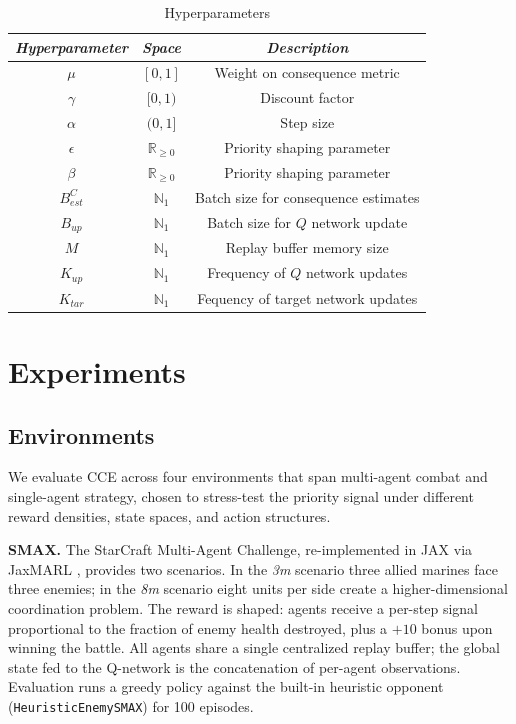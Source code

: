 \documentclass[conference]{IEEEtran}
\begin{document}
\begin{table}[htbp]
\caption{Hyperparameters}
\begin{center}
\begin{tabular}{|c|c|c|}
\hline
 \textbf{\textit{Hyperparameter}}& \textbf{\textit{Space}}& \textbf{\textit{Description}} \\
\hline
$\mu$ & $[0,1]$ & Weight on consequence metric \\
$\gamma$ & $[0,1)$ & Discount factor \\
$\alpha$ & $(0,1]$ & Step size \\
$\epsilon$ & $\mathbb{R}_{\geq0}$ & Priority shaping parameter \\
$\beta$ & $\mathbb{R}_{\geq0}$ & Priority shaping parameter \\
$B_{est}^C$ & $\mathbb{N}_1$ & Batch size for consequence estimates \\
$B_{up}$ & $\mathbb{N}_1$ & Batch size for $Q$ network update \\
$M$ & $\mathbb{N}_1$ & Replay buffer memory size \\
$K_{up}$ & $\mathbb{N}_1$ & Frequency of $Q$ network updates \\
$K_{tar}$ & $\mathbb{N}_1$ & Fequency of target network updates \\
\hline
\end{tabular}
\label{tab1}
\end{center}
\end{table}

\section{Experiments}

\subsection{Environments}

\noindent We evaluate CCE across four environments that span multi-agent combat and single-agent strategy, chosen to stress-test the priority signal under different reward densities, state spaces, and action structures.

\textbf{SMAX.} The StarCraft Multi-Agent Challenge, re-implemented in JAX via JaxMARL \cite{jaxmarl2023}, provides two scenarios. In the \emph{3m} scenario three allied marines face three enemies; in the \emph{8m} scenario eight units per side create a higher-dimensional coordination problem. The reward is shaped: agents receive a per-step signal proportional to the fraction of enemy health destroyed, plus a $+10$ bonus upon winning the battle. All agents share a single centralized replay buffer; the global state fed to the Q-network is the concatenation of per-agent observations. Evaluation runs a greedy policy against the built-in heuristic opponent (\texttt{HeuristicEnemySMAX}) for 100 episodes.
\end{document}
